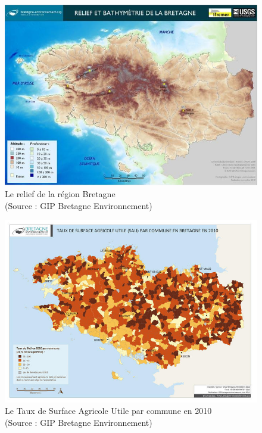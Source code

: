 \documentclass[a4paper,12pt]{report}
\begin{document}
			\begin{figure}[!h]
			\centering
			\includegraphics[width=17cm]{Illustrations/ReliefEtBathymetrie.jpg}
			\caption{Le relief de la région Bretagne\\(Source : GIP Bretagne Environnement\cite{BretagneEnvironnement})}
			\label{ReliefBathymetrie}
			\end{figure}
			
			\begin{figure}[!h]
			\centering
			\includegraphics[width=17cm]{Illustrations/SAUParCommune.jpg}
			\caption{Le Taux de Surface Agricole Utile par commune en 2010\\(Source : GIP Bretagne Environnement\cite{BretagneEnvironnement})}
			\label{SAUParCommune}
			\end{figure}
			
\end{document}
